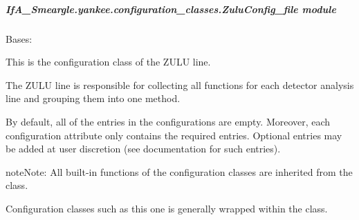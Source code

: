 \documentclass[letterpaper,10pt,english]{sphinxmanual}
\begin{document}
\subparagraph{IfA\_Smeargle.yankee.configuration\_classes.ZuluConfig\_file module}
\label{\detokenize{python_docstrings/IfA_Smeargle.yankee.configuration_classes.ZuluConfig_file:module-IfA_Smeargle.yankee.configuration_classes.ZuluConfig_file}}\label{\detokenize{python_docstrings/IfA_Smeargle.yankee.configuration_classes.ZuluConfig_file:ifa-smeargle-yankee-configuration-classes-zuluconfig-file-module}}\label{\detokenize{python_docstrings/IfA_Smeargle.yankee.configuration_classes.ZuluConfig_file::doc}}

\begin{fulllineitems}
\label{\detokenize{python_docstrings/IfA_Smeargle.yankee.configuration_classes.ZuluConfig_file:IfA_Smeargle.yankee.configuration_classes.ZuluConfig_file.ZuluConfig}}
Bases: {\hyperref[\detokenize{python_docstrings/IfA_Smeargle.yankee.configuration_classes.BaseConfig_file:IfA_Smeargle.yankee.configuration_classes.BaseConfig_file.BaseConfig}]{}}

This is the configuration class of the ZULU line.

The ZULU line is responsible for collecting all functions for each
detector analysis line and grouping them into one method.

By default, all of the entries in the configurations are empty. Moreover,
each configuration attribute only contains the required entries. Optional
entries may be added at user discretion (see documentation for such
entries).

\begin{sphinxadmonition}{note}{Note:}
All built-in functions of the configuration classes are inherited from the
{\hyperref[\detokenize{python_docstrings/IfA_Smeargle.yankee.configuration_classes.BaseConfig_file:IfA_Smeargle.yankee.configuration_classes.BaseConfig_file.BaseConfig}]{}}
class.

Configuration classes such as this one is generally wrapped within the
{\hyperref[\detokenize{python_docstrings/IfA_Smeargle.yankee.yankee_main:IfA_Smeargle.yankee.yankee_main.SmeargleConfig}]{}} class.
\end{sphinxadmonition}

\end{fulllineitems}
\end{document}
